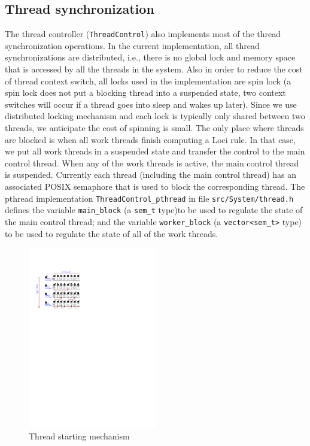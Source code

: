 \documentclass{article}
\begin{document}
\subsection{Thread synchronization}
\label{sec:sync}
The thread controller (\lstinline{ThreadControl}) also implements most
of the thread synchronization operations.  In the current
implementation, all thread synchronizations are distributed, i.e., there
is no global lock and memory space that is accessed by all the threads
in the system. Also in order to reduce the cost of thread context
switch, all locks used in the implementation are spin lock (a spin lock
does not put a blocking thread into a suspended state, two context
switches will occur if a thread goes into sleep and wakes up later).
Since we use distributed locking mechanism and each lock is typically
only shared between two threads, we anticipate the cost of spinning is
small.  The only place where threads are blocked is when all work
threads finish computing a Loci rule.  In that case, we put all work
threads in a suspended state and transfer the control to the main
control thread.  When any of the work threads is active, the main
control thread is suspended.  Currently each thread (including the main
control thread) has an associated POSIX semaphore that is used to block
the corresponding thread.  The pthread implementation
\lstinline{ThreadControl_pthread} in file \texttt{src/System/thread.h}
defines the variable \lstinline{main_block} (a \lstinline{sem_t} type)to
be used to regulate the state of the main control thread; and the
variable \lstinline{worker_block} (a \lstinline{vector<sem_t>} type) to
be used to regulate the state of all of the work threads.

\begin{figure}[h]
  \begin{center}
    \includegraphics[width=0.5\textwidth]{restart}
    \caption{Thread starting mechanism\label{fig:restart}}
  \end{center}
\end{figure}
\end{document}
